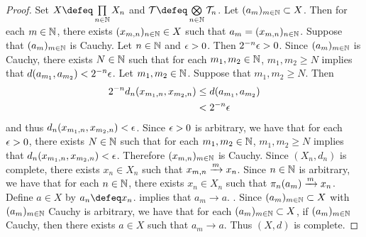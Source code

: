 \documentclass{book}
\begin{document}
\begin{proof}
	Set $X \defeq \prod\limits_{n \in \N} X_n$ and $\MT \defeq \bigotimes\limits_{n \in \N} \MT_n$. Let $(a_m)_{m \in \mathbb{N}} \subset X$. Then for each $m \in \mathbb{N}$, there exists $(x_{m,n})_{n \in \mathbb{N}} \in X$ such that $a_m = (x_{m,n})_{n \in \mathbb{N}}$. Suppose that $(a_m)_{m \in \mathbb{N}}$ is Cauchy. Let $n \in \mathbb{N}$ and $\epsilon > 0$. Then $2^{-n} \epsilon > 0$. Since $(a_m)_{m \in \mathbb{N}}$ is Cauchy, there exists $N \in \mathbb{N}$ such that for each $m_1, m_2 \in \mathbb{N}$, $m_1, m_2 \geq N$ implies that $d(a_{m_1}, a_{m_2}) < 2^{-n} \epsilon$. Let $m_1, m_2 \in \mathbb{N}$. Suppose that $m_1, m_2 \geq N$. Then
	\begin{align*}
		2^{-n} d_n(x_{m_1, n}, x_{m_2, n})
		& \leq d(a_{m_1}, a_{m_2}) \\
		& < 2^{-n} \epsilon  
	\end{align*}
	and thus $d_n(x_{m_1, n}, x_{m_2, n}) < \epsilon$. Since $\epsilon > 0$ is arbitrary, we have that for each $\epsilon >0$, there exists $N \in \mathbb{N}$ such that for each $m_1, m_2 \in \mathbb{N}$, $m_1, m_2 \geq N$ implies that $d_n(x_{m_1, n}, x_{m_2, n}) < \epsilon$. Therefore $(x_{m,n})_{m \in \mathbb{N}}$ is Cauchy. Since $(X_n, d_n)$ is complete, there exists $x_n \in X_n$ such that $x_{m,n} \xrightarrow{m} x_n$. Since $n \in \mathbb{N}$ is arbitrary, we have that for each $n \in \mathbb{N}$, there exists $x_n \in X_n$ such that $\pi_n(a_m) \xrightarrow{m} x_n$. Define $a \in X$ by $a_n \defeq x_n$.  implies that $a_m \rightarrow a$. . Since $(a_m)_{m \in \mathbb{N}} \subset X$ with $(a_m)_{m \in \mathbb{N}}$ Cauchy is arbitrary, we have that for each $(a_m)_{m \in \mathbb{N}} \subset X$, if $(a_m)_{m \in \mathbb{N}}$ Cauchy, then there exists $a \in X$ such that $a_m \rightarrow a$. Thus $(X, d)$ is complete.
\end{proof}
\end{document}
